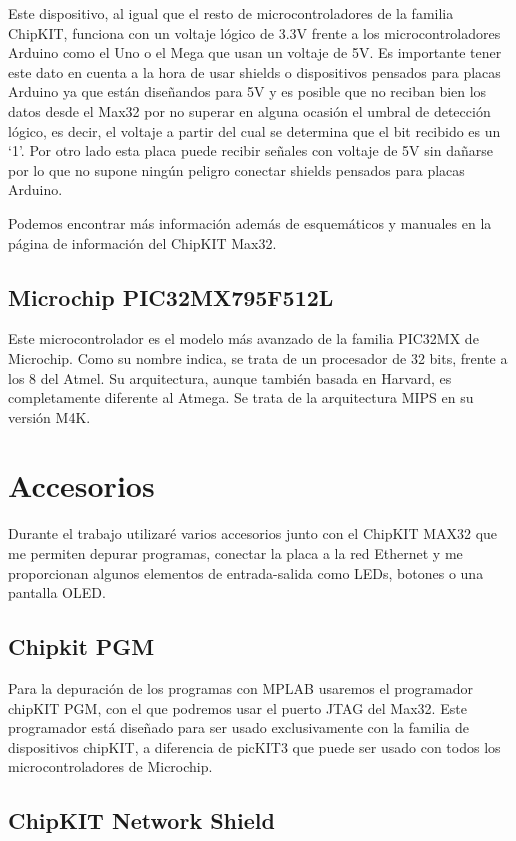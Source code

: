 Este dispositivo, al igual que el resto de microcontroladores de la familia ChipKIT, funciona con un voltaje lógico de 3.3V frente a los microcontroladores Arduino como el Uno o el Mega que usan un voltaje de 5V. Es importante tener este dato en cuenta a la hora de usar shields o dispositivos pensados para placas Arduino ya que están diseñandos para 5V y es posible que no reciban bien los datos desde el Max32 por no superar en alguna ocasión el umbral de detección lógico, es decir, el voltaje a partir del cual se determina que el bit recibido es un `1'. Por otro lado esta placa puede recibir señales con voltaje de 5V sin dañarse por lo que no supone ningún peligro conectar shields pensados para placas Arduino.

Podemos encontrar más información además de esquemáticos y manuales en la página de información del ChipKIT Max32.\cite{website:max32}

\subsection*{Microchip PIC32MX795F512L}
Este microcontrolador es el modelo más avanzado de la familia PIC32MX de Microchip. Como su nombre indica, se trata de un procesador de 32 bits, frente a los 8 del Atmel. Su arquitectura, aunque también basada en Harvard, es completamente diferente al Atmega. Se trata de la arquitectura MIPS en su versión M4K.

\section{Accesorios}
Durante el trabajo utilizaré varios accesorios junto con el ChipKIT MAX32 que me permiten depurar programas, conectar la placa a la red Ethernet y me proporcionan algunos elementos de entrada-salida como LEDs, botones o una pantalla OLED.
\subsection{Chipkit PGM}
Para la depuración de los programas con MPLAB usaremos el programador chipKIT PGM\cite{website:pgm}, con el que podremos usar el puerto JTAG del Max32. Este programador está diseñado para ser usado exclusivamente con la familia de dispositivos chipKIT, a diferencia de picKIT3\cite{website:pickit} que puede ser usado con todos los microcontroladores de Microchip.


\subsection{ChipKIT Network Shield}

